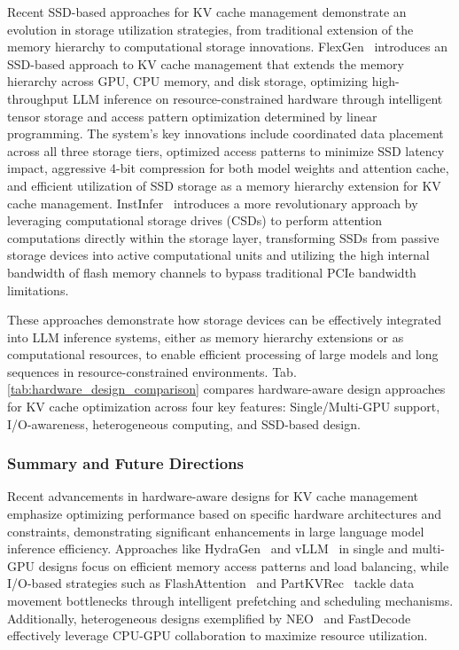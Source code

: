 Recent SSD-based approaches for KV cache management demonstrate an evolution in storage utilization strategies, from traditional extension of the memory hierarchy to computational storage innovations. 
FlexGen~\cite{DBLP:conf/icml/0007ZYLRCLRSZ23} introduces an SSD-based approach to KV cache management that extends the memory hierarchy across GPU, CPU memory, and disk storage, optimizing high-throughput LLM inference on resource-constrained hardware through intelligent tensor storage and access pattern optimization determined by linear programming. The system's key innovations include coordinated data placement across all three storage tiers, optimized access patterns to minimize SSD latency impact, aggressive 4-bit compression for both model weights and attention cache, and efficient utilization of SSD storage as a memory hierarchy extension for KV cache management. 
InstInfer~\cite{pan2024instinferinstorageattentionoffloading} introduces a more revolutionary approach by leveraging computational storage drives (CSDs) to perform attention computations directly within the storage layer, transforming SSDs from passive storage devices into active computational units and utilizing the high internal bandwidth of flash memory channels to bypass traditional PCIe bandwidth limitations. 

These approaches demonstrate how storage devices can be effectively integrated into LLM inference systems, either as memory hierarchy extensions or as computational resources, to enable efficient processing of large models and long sequences in resource-constrained environments.
Tab.\ref{tab:hardware_design_comparison} compares hardware-aware design approaches for KV cache optimization across four key features: Single/Multi-GPU support, I/O-awareness, heterogeneous computing, and SSD-based design.

\subsubsection{Summary and Future Directions} 
Recent advancements in hardware-aware designs for KV cache management emphasize optimizing performance based on specific hardware architectures and constraints, demonstrating significant enhancements in large language model inference efficiency. Approaches like HydraGen~\cite{juravsky2024hydragenhighthroughputllminference} and vLLM~\cite{DBLP:conf/sosp/KwonLZ0ZY0ZS23} in single and multi-GPU designs focus on efficient memory access patterns and load balancing, while I/O-based strategies such as FlashAttention~\cite{DBLP:conf/nips/DaoFERR22} and PartKVRec~\cite{jiang2024efficientllminferenceioaware} tackle data movement bottlenecks through intelligent prefetching and scheduling mechanisms. Additionally, heterogeneous designs exemplified by NEO~\cite{jiang2024neosavinggpumemory} and FastDecode~\cite{he2024fastdecodehighthroughputgpuefficientllm} effectively leverage CPU-GPU collaboration to maximize resource utilization. 


